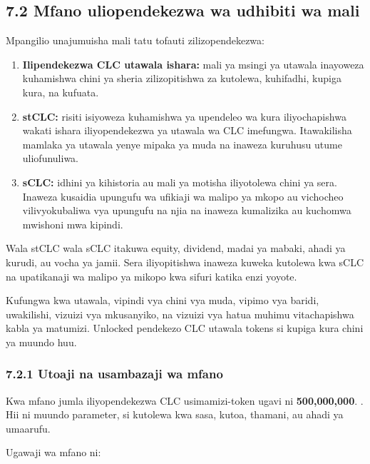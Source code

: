 \documentclass[11pt]{article}
\begin{document}
\subsection*{7.2 Mfano uliopendekezwa wa udhibiti wa mali}

Mpangilio unajumuisha mali tatu tofauti zilizopendekezwa:

\begin{enumerate}[leftmargin=*]
\item \textbf{Ilipendekezwa CLC utawala ishara:} mali ya msingi ya utawala inayoweza kuhamishwa chini ya sheria zilizopitishwa za kutolewa, kuhifadhi, kupiga kura, na kufuata.
\item \textbf{stCLC:} risiti isiyoweza kuhamishwa ya upendeleo wa kura iliyochapishwa wakati ishara iliyopendekezwa ya utawala wa CLC imefungwa. Itawakilisha mamlaka ya utawala yenye mipaka ya muda na inaweza kuruhusu utume uliofunuliwa.
\item \textbf{sCLC:} idhini ya kihistoria au mali ya motisha iliyotolewa chini ya sera. Inaweza kusaidia upungufu wa ufikiaji wa malipo ya mkopo au vichocheo vilivyokubaliwa vya upungufu na njia na inaweza kumalizika au kuchomwa mwishoni mwa kipindi.
\end{enumerate}
Wala stCLC wala sCLC itakuwa equity, dividend, madai ya mabaki, ahadi ya kurudi, au vocha ya jamii. Sera iliyopitishwa inaweza kuweka kutolewa kwa sCLC na upatikanaji wa malipo ya mikopo kwa sifuri katika enzi yoyote.

Kufungwa kwa utawala, vipindi vya chini vya muda, vipimo vya baridi, uwakilishi, vizuizi vya mkusanyiko, na vizuizi vya hatua muhimu vitachapishwa kabla ya matumizi. Unlocked pendekezo CLC utawala tokens si kupiga kura chini ya muundo huu.

\subsubsection*{7.2.1 Utoaji na usambazaji wa mfano}

Kwa mfano jumla iliyopendekezwa CLC usimamizi-token ugavi ni \textbf{500,000,000}. . Hii ni muundo parameter, si kutolewa kwa sasa, kutoa, thamani, au ahadi ya umaarufu.

Ugawaji wa mfano ni:
\end{document}
